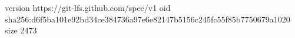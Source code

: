 version https://git-lfs.github.com/spec/v1
oid sha256:d6f5ba101e92bd34ce384736a97e6e82147b5156c245fc55f85b7750679a1020
size 2473
